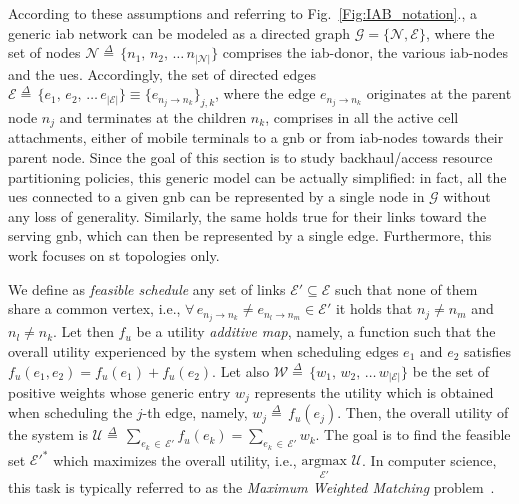 According to these assumptions and referring to Fig.~\ref{Fig:IAB_notation}., a generic \gls{iab} network can be modeled as a directed graph $\mathcal{G} = \{\mathcal{N},  \mathcal{E} \}$, where the set of nodes $\mathcal{N} \mathop = \limits^{\Delta} \, \{ n_1, \, n_2, \, \ldots \, n_{\vert \mathcal{N} \vert }  \}$ comprises the \gls{iab}-donor, the various \gls{iab}-nodes and the \glspl{ue}. 
Accordingly, the set of directed edges $\mathcal{E} \mathop = \limits^{\Delta} \, \{ e_{1} , \, e_{2}, \, \ldots \, \allowbreak e_{\vert \mathcal{E} \vert} \} \equiv \{ e_{n_j \to n_k} \}_{j, k} $, where the edge $e_{n_j \to n_k}$ originates at the parent node $n_j$ and terminates at the children $n_k$, comprises in all the active cell attachments, either of mobile terminals to a \gls{gnb} or from \gls{iab}-nodes towards their parent node.
Since the goal of this section is to study backhaul/access resource partitioning policies, this generic model can be actually simplified: in fact, all the \glspl{ue} connected to a given \gls{gnb} can be represented by a single node in $\mathcal{G}$ without any loss of generality. Similarly, the same holds true for their links toward the serving \gls{gnb}, which can then be represented by a single edge. 
Furthermore, this work focuses on \gls{st} topologies only. 

We define as \textit{feasible schedule} any set of links $\mathcal{E'} \subseteq \mathcal{E}$ such that none of them share a common vertex, i.e., $ \forall \, e_{n_j \to n_k} \neq e_{n_l \to n_m} \in \mathcal{E'}$ it holds that $n_{j} \neq n_{m}$ and $n_{l} \neq n_{k}$. Let then $f_u$ be a utility \textit{additive map}, namely, a function such that the overall utility experienced by the system when scheduling edges $e_1$ and $e_2$ satisfies $f_u (e_1, e_2) = f_u (e_1) + f_u(e_2)$. Let also $\mathcal{W} \mathop = \limits^{\Delta} \, \{ w_1, \, w_2, \, \ldots \, w_{\vert \mathcal{E} \vert } \}$ be the set of positive weights whose generic entry $w_j$ represents the utility which is obtained when scheduling the $j$-th edge, namely, $w_j \mathop = \limits^{\Delta} \, f_u (e_j)$. Then, the overall utility of the system is $\mathcal{U} \mathop = \limits^{\Delta} \, \sum_{e_k \, \in \, \mathcal{E'}} f_u(e_k) = \sum_{e_k \, \in \, \mathcal{E'}} w_k $.
The goal is to find the feasible set $\mathcal{E'}^{*}$ which maximizes the overall utility, i.e., $\underset{\mathcal{E'}}{\mathrm{argmax}} \,\, \mathcal{U} $. In computer science, this task is typically referred to as the \textit{Maximum Weighted Matching} problem~\cite{Korte2002}.

